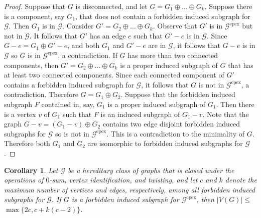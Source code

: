 \documentclass[11pt]{amsart}
\newtheorem{corollary}[theorem]{Corollary}
\theoremstyle{definition}
\theoremstyle{remark}
\numberwithin{equation}{section}
\newcommand\Ga{\mathcal{G}^\mathrm{epex}}
\begin{document}
\begin{proof}
Suppose that $G$ is disconnected, and let $G = G_1 \oplus \ldots \oplus G_k$. Suppose there is a component, say $G_1$, that does not contain a forbidden induced subgraph for $\mathcal{G}$. Then $G_1$ is in $\mathcal{G}$. Consider $G' = G_2 \oplus \ldots \oplus G_k$. Observe that $G'$ is in $\Ga$ but not in $\mathcal{G}$. It follows that $G'$ has an edge $e$ such that $G'-e$ is in $\mathcal{G}$. Since $G-e = G_1 \oplus G'-e$, and both $G_1$ and $G'-e$ are in $\mathcal{G}$, it follows that $G-e$ is in $\mathcal{G}$ so $G$ is in $\Ga$, a contradiction.  
If $G$ has more than two connected components, then $G' = G_2 \oplus \ldots \oplus G_k$ is a proper induced subgraph of $G$ that has at least two connected components. Since each connected component of $G'$ contains a forbidden induced subgraph for $\mathcal{G}$, it follows that $G$ is not in $\Ga$, a contradiction. Therefore $G = G_1 \oplus G_2$. Suppose that the forbidden induced subgraph $F$ contained in, say, $G_1$ is a proper induced subgraph of $G_1$. Then there is a vertex $v$ of $G_1$ such that $F$ is an induced subgraph of $G_1 - v$. Note that the graph $G-v = (G_1 - v) \oplus G_2$ contains two edge disjoint forbidden induced subgraphs for $\mathcal{G}$ so is not in $\Ga$. This is a contradiction to the minimality of $G$. Therefore both $G_1$ and $G_2$ are isomorphic to forbidden induced subgraphs for $\mathcal{G}$.
\end{proof}





\begin{corollary}
\label{final_conclusion}
Let $\mathcal{G}$ be a hereditary class of graphs that is closed under the operations of $0$-sum, vertex identification, and twisting, and let $c$ and $k$ denote the maximum number of vertices and edges, respectively, among all forbidden induced subgraphs for $\mathcal{G}$. If $G$ is a forbidden induced subgraph for $\Ga$, then $|V(G)| \leq $  $\max \{2c, c + k(c-2)\}$.
\end{corollary}
\end{document}
